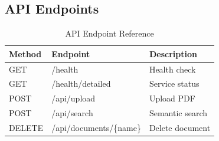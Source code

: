 \documentclass[11pt,a4paper]{article}
\begin{document}
\subsection{API Endpoints}

\begin{table}[H]
\centering
\begin{tabular}{lll}
\toprule
\textbf{Method} & \textbf{Endpoint} & \textbf{Description} \\
\midrule
GET & /health & Health check \\
GET & /health/detailed & Service status \\
POST & /api/upload & Upload PDF \\
POST & /api/search & Semantic search \\
DELETE & /api/documents/\{name\} & Delete document \\
\bottomrule
\end{tabular}
\caption{API Endpoint Reference}
\end{table}
\end{document}
